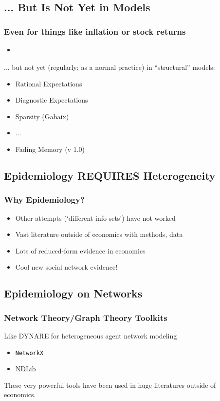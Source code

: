 \documentclass[pdflatex]{beamer}
\begin{document}
\subsection{... But Is Not Yet in Models}\label{EpiExpHet}\hypertarget{EpiExpHet}{}

\begin{frame}\frametitle{Even for things like inflation or stock returns}

\begin{itemize}
    \item \cite{gmsuBeliefs}
\end{itemize}

... but not yet (regularly; as a normal practice) in ``structural'' models:

\begin{itemize}
    \item Rational Expectations
    \item Diagnostic Expectations
    \item Sparsity (Gabaix)
    \item ...
    \item Fading Memory (v 1.0)
\end{itemize}

\end{frame}

\subsection{Epidemiology REQUIRES Heterogeneity}
\begin{frame}\frametitle{Why Epidemiology?}

\begin{itemize}
    \item Other attempts (`different info sets') have not worked
    \item Vast literature outside of economics with methods, data
    \item Lots of reduced-form evidence in economics
    \item Cool new social network evidence!
\end{itemize}

\end{frame}

\subsection{Epidemiology on Networks}

\begin{frame}\frametitle{Network Theory/Graph Theory Toolkits}
    Like DYNARE for heterogeneous agent network modeling

    \begin{itemize}
        \item \texttt{NetworkX}
        \item \href{https://mybinder.org/v2/gh/llorracc/EpiExp/HEAD?filepath=SIR_Ndlib.ipynb}{NDLib}
    \end{itemize}

    These very powerful tools have been used in huge literatures outside of economics.

\end{frame}
\end{document}
